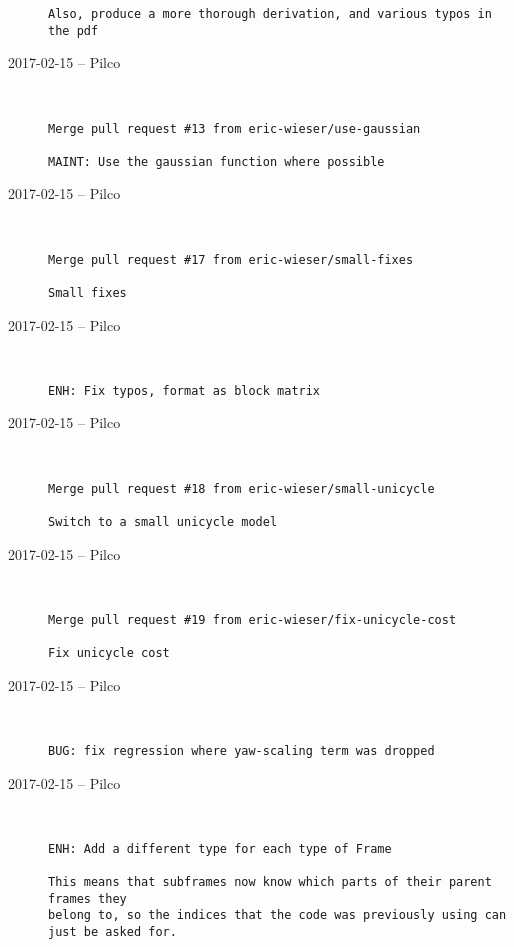 \begin{description}
\begin{lstlisting}
Also, produce a more thorough derivation, and various typos in the pdf
\end{lstlisting}


  \item[2017-02-15 -- Pilco] \hfill \
\begin{lstlisting}
Merge pull request #13 from eric-wieser/use-gaussian

MAINT: Use the gaussian function where possible\end{lstlisting}


  \item[2017-02-15 -- Pilco] \hfill \
\begin{lstlisting}
Merge pull request #17 from eric-wieser/small-fixes

Small fixes\end{lstlisting}


  \item[2017-02-15 -- Pilco] \hfill \
\begin{lstlisting}
ENH: Fix typos, format as block matrix
\end{lstlisting}


  \item[2017-02-15 -- Pilco] \hfill \
\begin{lstlisting}
Merge pull request #18 from eric-wieser/small-unicycle

Switch to a small unicycle model\end{lstlisting}


  \item[2017-02-15 -- Pilco] \hfill \
\begin{lstlisting}
Merge pull request #19 from eric-wieser/fix-unicycle-cost

Fix unicycle cost\end{lstlisting}


  \item[2017-02-15 -- Pilco] \hfill \
\begin{lstlisting}
BUG: fix regression where yaw-scaling term was dropped
\end{lstlisting}


  \item[2017-02-15 -- Pilco] \hfill \
\begin{lstlisting}
ENH: Add a different type for each type of Frame

This means that subframes now know which parts of their parent frames they
belong to, so the indices that the code was previously using can just be asked for.
\end{lstlisting}



\end{description}
